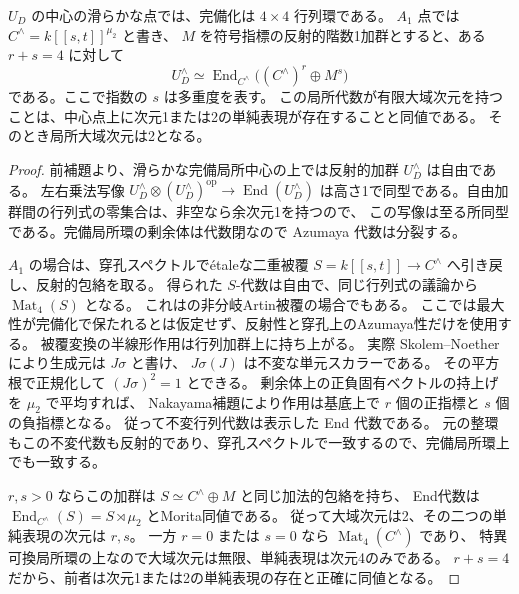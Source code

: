\begin{lemma}[$A_1$中心における小次元単純表現判定]
\label{lem:order4-A1-local-order}
$U_D$ の中心の滑らかな点では、完備化は $4\times4$ 行列環である。
$A_1$ 点では $C^{\wedge}=k[[s,t]]^{\mu_2}$ と書き、
$M$ を符号指標の反射的階数1加群とすると、ある $r+s=4$ に対して
\[
 U_D^{\wedge}\simeq
 \operatorname{End}_{C^{\wedge}}\bigl((C^{\wedge})^r\oplus M^s\bigr)
\]
である。ここで指数の $s$ は多重度を表す。
この局所代数が有限大域次元を持つことは、中心点上に次元1または2の単純表現が存在することと同値である。
そのとき局所大域次元は2となる。
\end{lemma}
\begin{proof}
前補題より、滑らかな完備局所中心の上では反射的加群 $U_D^{\wedge}$ は自由である。
左右乗法写像
$U_D^{\wedge}\otimes(U_D^{\wedge})^{\mathrm{op}}\to\operatorname{End}(U_D^{\wedge})$
は高さ1で同型である。自由加群間の行列式の零集合は、非空なら余次元1を持つので、
この写像は至る所同型である。完備局所環の剰余体は代数閉なので Azumaya 代数は分裂する。

$A_1$ の場合は、穿孔スペクトルで\'{e}taleな二重被覆
$S=k[[s,t]]\to C^{\wedge}$ へ引き戻し、反射的包絡を取る。
得られた $S$-代数は自由で、同じ行列式の議論から $\operatorname{Mat}_4(S)$ となる。
これは\cite[Theorem 3.1]{CHIOrders}の非分岐Artin被覆の場合でもある。
ここでは最大性が完備化で保たれるとは仮定せず、反射性と穿孔上のAzumaya性だけを使用する。
被覆変換の半線形作用は行列加群上に持ち上がる。
実際 Skolem--Noether により生成元は $J\sigma$ と書け、
$J\sigma(J)$ は不変な単元スカラーである。
その平方根で正規化して $(J\sigma)^2=1$ とできる。
剰余体上の正負固有ベクトルの持上げを $\mu_2$ で平均すれば、
Nakayama補題により作用は基底上で $r$ 個の正指標と $s$ 個の負指標となる。
従って不変行列代数は表示した End 代数である。
元の整環もこの不変代数も反射的であり、穿孔スペクトルで一致するので、完備局所環上でも一致する。

$r,s>0$ ならこの加群は $S\simeq C^{\wedge}\oplus M$ と同じ加法的包絡を持ち、
End代数は $\operatorname{End}_{C^{\wedge}}(S)=S\rtimes\mu_2$ とMorita同値である。
従って大域次元は2、その二つの単純表現の次元は $r,s$。
一方 $r=0$ または $s=0$ なら $\operatorname{Mat}_4(C^{\wedge})$ であり、
特異可換局所環の上なので大域次元は無限、単純表現は次元4のみである。
$r+s=4$ だから、前者は次元1または2の単純表現の存在と正確に同値となる。
\end{proof}


